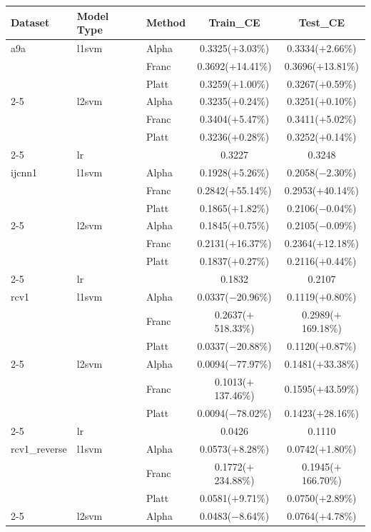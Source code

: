 \begin{tabular}{@{}lllcc@{}}
Dataset & Model Type & Method & Train\_CE & Test\_CE \\
\hline
a9a & l1svm & Alpha & 0.3325($+$3.03\%) & 0.3334($+$2.66\%) \\
 &  & Franc & 0.3692($+$14.41\%) & 0.3696($+$13.81\%) \\
 &  & Platt & 0.3259($+$1.00\%) & 0.3267($+$0.59\%) \\
\cline{2-5}
 & l2svm & Alpha & 0.3235($+$0.24\%) & 0.3251($+$0.10\%) \\
 &  & Franc & 0.3404($+$5.47\%) & 0.3411($+$5.02\%) \\
 &  & Platt & 0.3236($+$0.28\%) & 0.3252($+$0.14\%) \\
\cline{2-5}
 & lr &  & 0.3227 & 0.3248 \\
\hline
ijcnn1 & l1svm & Alpha & 0.1928($+$5.26\%) & 0.2058($-$2.30\%) \\
 &  & Franc & 0.2842($+$55.14\%) & 0.2953($+$40.14\%) \\
 &  & Platt & 0.1865($+$1.82\%) & 0.2106($-$0.04\%) \\
\cline{2-5}
 & l2svm & Alpha & 0.1845($+$0.75\%) & 0.2105($-$0.09\%) \\
 &  & Franc & 0.2131($+$16.37\%) & 0.2364($+$12.18\%) \\
 &  & Platt & 0.1837($+$0.27\%) & 0.2116($+$0.44\%) \\
\cline{2-5}
 & lr &  & 0.1832 & 0.2107 \\
\hline
rcv1 & l1svm & Alpha & 0.0337($-$20.96\%) & 0.1119($+$0.80\%) \\
 &  & Franc & 0.2637($+$518.33\%) & 0.2989($+$169.18\%) \\
 &  & Platt & 0.0337($-$20.88\%) & 0.1120($+$0.87\%) \\
\cline{2-5}
 & l2svm & Alpha & 0.0094($-$77.97\%) & 0.1481($+$33.38\%) \\
 &  & Franc & 0.1013($+$137.46\%) & 0.1595($+$43.59\%) \\
 &  & Platt & 0.0094($-$78.02\%) & 0.1423($+$28.16\%) \\
\cline{2-5}
 & lr &  & 0.0426 & 0.1110 \\
\hline
rcv1\_reverse & l1svm & Alpha & 0.0573($+$8.28\%) & 0.0742($+$1.80\%) \\
 &  & Franc & 0.1772($+$234.88\%) & 0.1945($+$166.70\%) \\
 &  & Platt & 0.0581($+$9.71\%) & 0.0750($+$2.89\%) \\
\cline{2-5}
 & l2svm & Alpha & 0.0483($-$8.64\%) & 0.0764($+$4.78\%) \\

\end{tabular}
